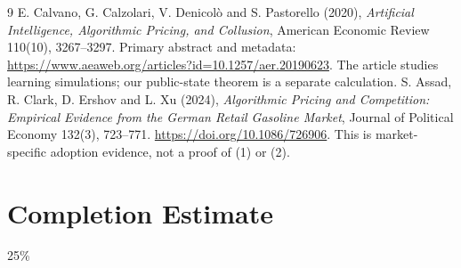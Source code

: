 \documentclass[11pt,a4paper]{article}
\theoremstyle{remark}
\begin{document}
\begin{thebibliography}{9}
 E. Calvano, G. Calzolari, V. Denicol\`o and S. Pastorello (2020), \emph{Artificial Intelligence, Algorithmic Pricing, and Collusion}, American Economic Review 110(10), 3267--3297. Primary abstract and metadata: \url{https://www.aeaweb.org/articles?id=10.1257/aer.20190623}. The article studies learning simulations; our public-state theorem is a separate calculation.
 S. Assad, R. Clark, D. Ershov and L. Xu (2024), \emph{Algorithmic Pricing and Competition: Empirical Evidence from the German Retail Gasoline Market}, Journal of Political Economy 132(3), 723--771. \url{https://doi.org/10.1086/726906}. This is market-specific adoption evidence, not a proof of (1) or (2).
\end{thebibliography}

\section{Completion Estimate}
25\%
\end{document}
